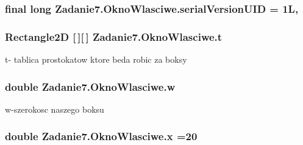 \subsubsection[{\texorpdfstring{serial\+Version\+U\+ID}{serialVersionUID}}]{\setlength{\rightskip}{0pt plus 5cm}final long Zadanie7.\+Okno\+Wlasciwe.\+serial\+Version\+U\+ID = 1L\hspace{0.3cm}{\ttfamily [static]}, {\ttfamily [private]}}\hypertarget{class_zadanie7_1_1_okno_wlasciwe_ad82a67e6a62aab90682d92db18f794d1}{}\label{class_zadanie7_1_1_okno_wlasciwe_ad82a67e6a62aab90682d92db18f794d1}
\subsubsection[{\texorpdfstring{t}{t}}]{\setlength{\rightskip}{0pt plus 5cm}Rectangle2D \mbox{[}$\,$\mbox{]}\mbox{[}$\,$\mbox{]} Zadanie7.\+Okno\+Wlasciwe.\+t\hspace{0.3cm}{\ttfamily [private]}}\hypertarget{class_zadanie7_1_1_okno_wlasciwe_a76e7cdaa5f7d262c3466f9e28126a1a4}{}\label{class_zadanie7_1_1_okno_wlasciwe_a76e7cdaa5f7d262c3466f9e28126a1a4}


t-\/ tablica prostokatow ktore beda robic za boksy 

\subsubsection[{\texorpdfstring{w}{w}}]{\setlength{\rightskip}{0pt plus 5cm}double Zadanie7.\+Okno\+Wlasciwe.\+w\hspace{0.3cm}{\ttfamily [private]}}\hypertarget{class_zadanie7_1_1_okno_wlasciwe_a160d088398a77a3897d8bac099c56577}{}\label{class_zadanie7_1_1_okno_wlasciwe_a160d088398a77a3897d8bac099c56577}


w-\/szerokosc naszego boksu 

\subsubsection[{\texorpdfstring{x}{x}}]{\setlength{\rightskip}{0pt plus 5cm}double Zadanie7.\+Okno\+Wlasciwe.\+x =20\hspace{0.3cm}{\ttfamily [private]}}\hypertarget{class_zadanie7_1_1_okno_wlasciwe_afc22e58c9c97b94e580568fb79a36bef}{}\label{class_zadanie7_1_1_okno_wlasciwe_afc22e58c9c97b94e580568fb79a36bef}


